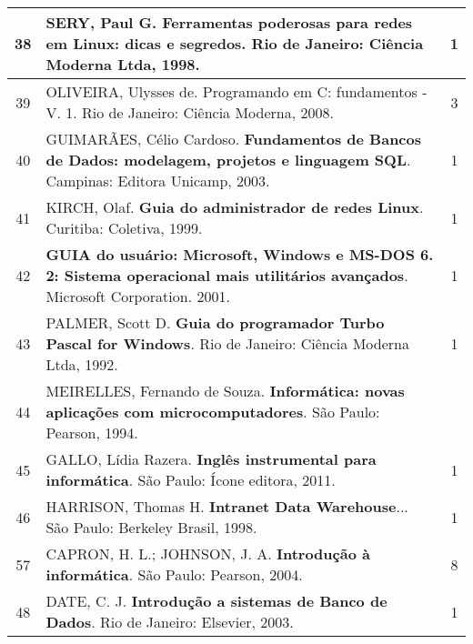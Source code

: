 \begin{longtable}{|c|p{115mm}|c|}
38     & SERY, Paul G. \textbf{Ferramentas poderosas para redes em Linux: dicas e segredos}. Rio de Janeiro: Ciência Moderna Ltda, 1998. & 1          \\ \hline
39     & OLIVEIRA, Ulysses de. Programando em C: fundamentos - V. 1. Rio de Janeiro: Ciência Moderna, 2008. & 3          \\ \hline
40     & GUIMARÃES, Célio Cardoso. \textbf{Fundamentos de Bancos de Dados: modelagem, projetos e linguagem SQL}. Campinas: Editora Unicamp, 2003. & 1          \\ \hline
41     & KIRCH, Olaf. \textbf{Guia do administrador de redes Linux}. Curitiba: Coletiva, 1999.          & 1          \\ \hline
42     & \textbf{GUIA do usuário: Microsoft, Windows e MS-DOS 6. 2: Sistema operacional mais utilitários avançados}. Microsoft Corporation. 2001. & 1          \\ \hline
43     & PALMER, Scott D. \textbf{Guia do programador Turbo Pascal for Windows}. Rio de Janeiro: Ciência Moderna Ltda, 1992. & 1          \\ \hline
44     & MEIRELLES, Fernando de Souza. \textbf{Informática: novas aplicações com microcomputadores}. São Paulo: Pearson, 1994. &           \\ \hline
45     & GALLO, Lídia Razera. \textbf{Inglês instrumental para informática}. São Paulo: Ícone editora, 2011. & 1          \\ \hline
46     & HARRISON, Thomas H. \textbf{Intranet Data Warehouse}... São Paulo: Berkeley Brasil, 1998.      & 1          \\ \hline
57     & CAPRON, H. L.; JOHNSON, J. A. \textbf{Introdução à informática}. São Paulo: Pearson, 2004.     & 8          \\ \hline
48     & DATE, C. J. \textbf{Introdução a sistemas de Banco de Dados}. Rio de Janeiro: Elsevier, 2003.  & 1          \\ \hline



\end{longtable}
